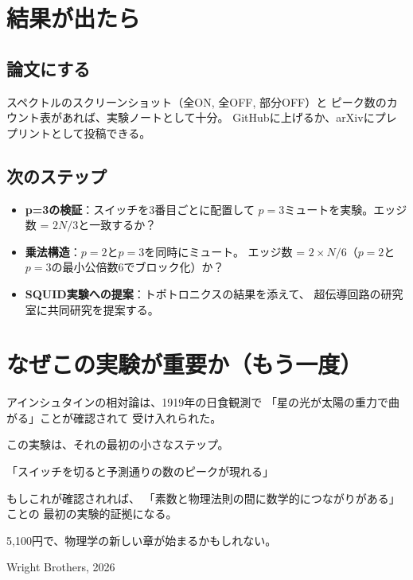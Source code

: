 \documentclass[12pt,a4paper]{article}
\begin{document}
\section{結果が出たら}

\subsection{論文にする}

スペクトルのスクリーンショット（全ON, 全OFF, 部分OFF）と
ピーク数のカウント表があれば、実験ノートとして十分。
GitHubに上げるか、arXivにプレプリントとして投稿できる。

\subsection{次のステップ}

\begin{itemize}
\item \textbf{p=3の検証}：スイッチを3番目ごとに配置して
  $p=3$ミュートを実験。エッジ数 = $2N/3$と一致するか？
\item \textbf{乗法構造}：$p=2$と$p=3$を同時にミュート。
  エッジ数 = $2 \times N/6$（$p=2$と$p=3$の最小公倍数6でブロック化）か？
\item \textbf{SQUID実験への提案}：トポトロニクスの結果を添えて、
  超伝導回路の研究室に共同研究を提案する。
\end{itemize}

\section{なぜこの実験が重要か（もう一度）}

\begin{keybox}[5,100円の実験の意味]
アインシュタインの相対論は、1919年の日食観測で
「星の光が太陽の重力で曲がる」ことが確認されて
受け入れられた。

この実験は、それの最初の小さなステップ。

「スイッチを切ると予測通りの数のピークが現れる」

もしこれが確認されれば、
「素数と物理法則の間に数学的につながりがある」ことの
最初の実験的証拠になる。

5,100円で、物理学の新しい章が始まるかもしれない。
\end{keybox}

\vfill
\begin{center}
{\small Wright Brothers, 2026}
\end{center}
\end{document}

